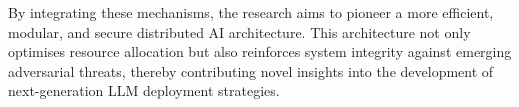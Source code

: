 \noindent By integrating these mechanisms, the research aims to pioneer a more efficient, modular, and secure distributed AI architecture. This architecture not only optimises resource allocation but also reinforces system integrity against emerging adversarial threats, thereby contributing novel insights into the development of next-generation LLM deployment strategies.